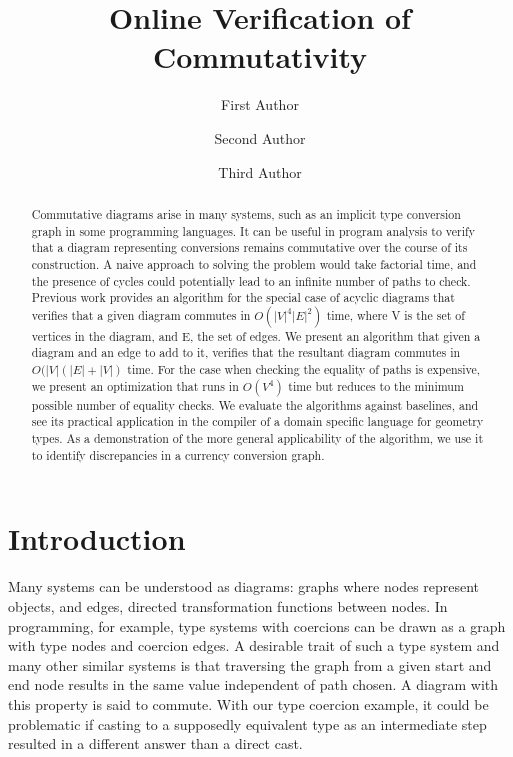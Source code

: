 \documentclass[sigplan,review,anonymous]{acmart}
\begin{document}
\title{Online Verification of Commutativity}
%
%
\author{First Author}
\author{Second Author}
\authornotemark[1]

\author{Third Author}

\begin{abstract}
Commutative diagrams arise in many systems, such as an implicit type conversion graph in some programming languages.
It can be useful in program analysis to verify that a diagram representing conversions remains commutative over the course of its construction.
A naive approach to solving the problem would take factorial time, and the presence of cycles could potentially lead to an infinite number of paths to check. Previous work provides an algorithm for the special case of acyclic diagrams that verifies that a given diagram commutes in $O(|V|^4|E|^2)$ time, where V is the set of vertices in the diagram, and E, the set of edges. 
We present an algorithm that given a diagram and an edge to add to it, verifies that the resultant diagram commutes in $O(|V|(|E| + |V|)$ time. For the case when checking the equality of paths is expensive, we present an optimization that runs in $O(V^4)$ time but reduces to the minimum possible number of equality checks. We evaluate the algorithms against baselines, and see its practical application in the compiler of a domain specific language for geometry types. As a demonstration of the more general applicability of the algorithm, we use it to identify discrepancies in a  currency conversion graph.
\end{abstract}
%
%
%

\maketitle

\section{Introduction}
Many systems can be understood as diagrams: graphs where nodes represent objects, and edges, directed transformation functions between nodes.
In programming, for example, type systems with coercions can be drawn as a graph with type nodes and coercion edges.
A desirable trait of such a type system and many other similar systems is that traversing the graph from a given start and end node results in the same value independent of path chosen.
A diagram with this property is said to commute.
With our type coercion example, it could be problematic if casting to a supposedly equivalent type as an intermediate step resulted in a different answer than a direct cast.
\end{document}
